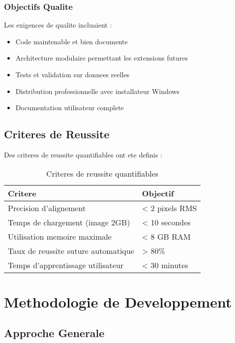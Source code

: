 \documentclass[12pt,a4paper]{article}
\begin{document}
\subsubsection{Objectifs Qualite}

Les exigences de qualite incluaient :

\begin{itemize}
\item Code maintenable et bien documente
\item Architecture modulaire permettant les extensions futures
\item Tests et validation sur donnees reelles
\item Distribution professionnelle avec installateur Windows
\item Documentation utilisateur complete
\end{itemize}

\subsection{Criteres de Reussite}

Des criteres de reussite quantifiables ont ete definis :

\begin{table}[h]
\centering
\begin{tabular}{|p{6cm}|p{4cm}|}
\hline
\textbf{Critere} & \textbf{Objectif} \\
\hline
Precision d'alignement & < 2 pixels RMS \\
\hline
Temps de chargement (image 2GB) & < 10 secondes \\
\hline
Utilisation memoire maximale & < 8 GB RAM \\
\hline
Taux de reussite suture automatique & > 80\% \\
\hline
Temps d'apprentissage utilisateur & < 30 minutes \\
\hline
\end{tabular}
\caption{Criteres de reussite quantifiables}
\end{table}

\section{Methodologie de Developpement}

\subsection{Approche Generale}
\end{document}
